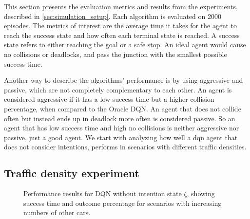This section presents the evaluation metrics and results from the experiments, described in \ref{sec:simulation_setup}. 
Each algorithm is evaluated on \num{2000} episodes. 
The metrics of interest are the average time it takes for the agent to reach the success state and how often each terminal state is reached. A success state refers to either reaching the goal or a safe stop. An ideal agent would cause no collisions or deadlocks, and pass the junction with the smallest possible success time.


Another way to describe the algorithms' performance is by using aggressive and passive, which are not completely complementary to each other. An agent is considered aggressive if it has a low success time but a higher collision percentage, when compared to the Oracle DQN. An agent that does not collide often but instead ends up in deadlock more often is considered passive. So an agent that has low success time and high no collisions is neither aggressive nor passive, just a good agent.
We start with analyzing how well a \gls{dqn} agent that does not consider intentions, performs in scenarios with different traffic densities. 

\subsection{Traffic density experiment}

\begin{figure}[!h]
    \centering
        
        \vspace{-0.8cm}
        \caption{Performance results for DQN without intention state $\zeta$, showing success time and outcome percentage for scenarios with increasing numbers of other cars.}
    \label{fig:number_cars}
\end{figure}

